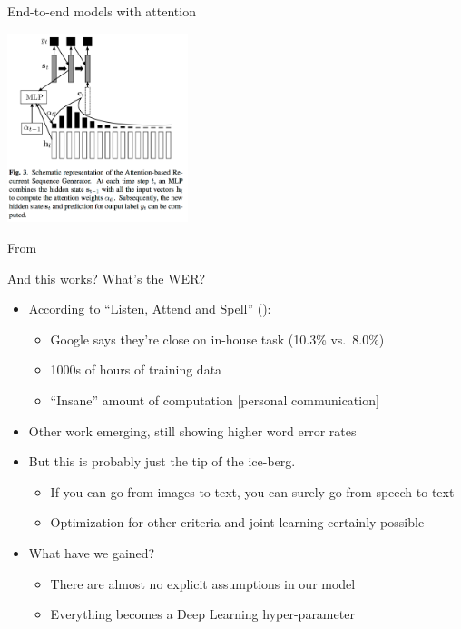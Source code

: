 \begin{frame}{End-to-end models with attention}
  \begin{center}
    \includegraphics[height=55mm]{figures/att}
  \end{center}
  \tiny From \cite{BahdanauCSBB15}
\end{frame}

\begin{frame}{And this works? What's the WER?}
  \begin{itemize}
  \item According to ``Listen, Attend and Spell'' (\cite{las}):
    \begin{itemize}
    \item Google says they're close on in-house task (10.3\% vs.\ 8.0\%)
    \item 1000s of hours of training data
    \item ``Insane'' amount of computation [personal communication]
    \end{itemize}
  \item Other work emerging, still showing higher word error rates
  \item But this is probably just the tip of the ice-berg.
    \begin{itemize}
    \item If you can go from images to text, you can surely go from speech to text
      \item Optimization for other criteria and joint learning certainly possible
    \end{itemize}
  \item What have we gained?
    \begin{itemize}
    \item There are almost no explicit assumptions in our model
    \item Everything becomes a Deep Learning hyper-parameter
    \end{itemize}
  \end{itemize}
\end{frame}

